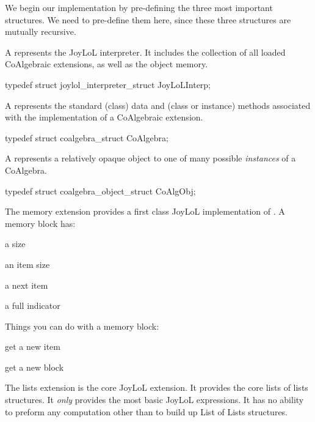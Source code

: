 We begin our implementation by pre-defining the three most important 
structures. We need to pre-define them here, since these three structures 
are mutually recursive. 

\startitemize

\item A  represents the JoyLoL interpreter. It includes 
the collection of all loaded CoAlgebraic extensions, as well as the object 
memory. 

\startCHeader 
typedef struct joylol_interpreter_struct JoyLoLInterp;
\stopCHeader 

\item A  represents the standard (class) data and (class 
or instance) methods associated with the implementation of a CoAlgebraic 
extension. 

\startCHeader
typedef struct coalgebra_struct CoAlgebra;
\stopCHeader

\item A  represents a relatively opaque object to one of 
many possible \emph{instances} of a CoAlgebra. 

\startCHeader
typedef struct coalgebra_object_struct CoAlgObj;
\stopCHeader 
\stopitemize

The memory extension provides a first class JoyLoL implementation of 
. A memory block has:

\startitemize

\item a size

\item an item size

\item a next item

\item a full indicator

\stopitemize

Things you can do with a memory block:

\startitemize

\item get a new item

\item get a new block

\stopitemize


The lists extension is the core JoyLoL extension. It provides the core 
lists of lists structures. It \emph{only} provides the most basic JoyLoL 
expressions. It has no ability to preform any computation other than to 
build up List of Lists structures. 

